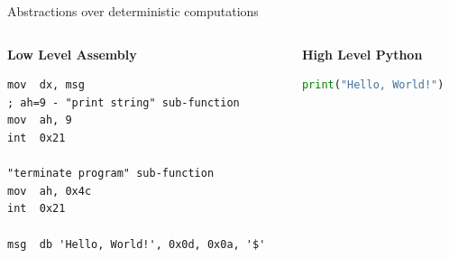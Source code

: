 \documentclass[12pt]{beamer}
\begin{document}
\begin{frame}[fragile]{Abstractions over deterministic computations}
    \begin{columns}
    \begin{column}[T]{0.5\textwidth}
        \textbf{Low Level Assembly}
        \begin{lstlisting}[language={[x86masm]Assembler}] 
mov  dx, msg
; ah=9 - "print string" sub-function
mov  ah, 9
int  0x21

"terminate program" sub-function
mov  ah, 0x4c
int  0x21

msg  db 'Hello, World!', 0x0d, 0x0a, '$'
        \end{lstlisting}
    \end{column}
    \pause
    \begin{column}[T]{0.5\textwidth}
        \textbf{High Level Python}
        \begin{lstlisting}[language=python]
print("Hello, World!")
        \end{lstlisting}
    \end{column}
    \end{columns}
\end{frame}
\end{document}
